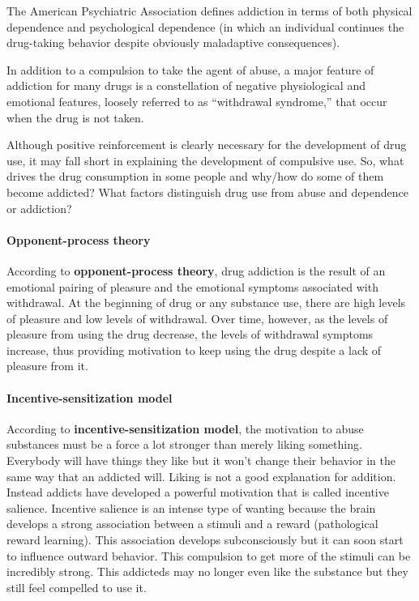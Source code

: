 \documentclass[12pt,article,oneside,a4paper]{memoir}
\begin{document}
The American Psychiatric Association defines addiction in terms of both physical
dependence and psychological dependence (in which an individual continues the
drug-taking behavior despite obviously maladaptive consequences).

In addition to a compulsion to take the agent of abuse, a major feature of
addiction for many drugs is a constellation of negative physiological and
emotional features, loosely referred to as “withdrawal syndrome,” that occur
when the drug is not taken. 

Although positive reinforcement is clearly necessary for the development of drug
use, it may fall short in explaining the development of compulsive use. So, what
drives the drug consumption in some people and why/how do some of them become
addicted? What factors distinguish drug use from abuse and dependence or
addiction?

\paragraph{Opponent-process theory}
According to \textbf{opponent-process theory}, drug addiction is the result of
an emotional pairing of pleasure and the emotional symptoms associated with
withdrawal. At the beginning of drug or any substance use, there are high levels
of pleasure and low levels of withdrawal. Over time, however, as the levels of
pleasure from using the drug decrease, the levels of withdrawal symptoms
increase, thus providing motivation to keep using the drug despite a lack of
pleasure from it.

\paragraph{Incentive-sensitization model}
According to \textbf{incentive-sensitization model}, the motivation to abuse
substances must be a force a lot stronger than merely liking something.
Everybody will have things they like but it won’t change their behavior in the
same way that an addicted will. Liking is not a good explanation for addition.
Instead addicts have developed a powerful motivation that is called incentive
salience. Incentive salience is an intense type of wanting because the brain
develops a strong association between a stimuli and a reward (pathological
reward learning). This association develops subconsciously but it can soon
start to influence outward behavior. This compulsion to get more of the stimuli
can be incredibly strong. This addicteds may no longer even like the substance
but they still feel compelled to use it.
\end{document}
